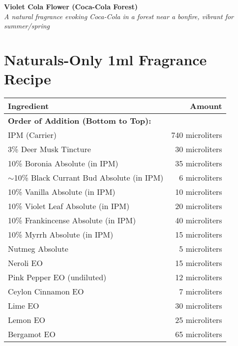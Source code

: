 \documentclass{article}
\begin{document}
\begin{center}
\textcolor{violetPurple}{\LARGE\textbf{Violet Cola Flower (Coca-Cola Forest)}}\\[0.5cm]
\textcolor{colaBrown}{\large\textit{A natural fragrance evoking Coca-Cola in a forest near a bonfire, vibrant for summer/spring}}\\[0.5cm]
\end{center}

\section*{Naturals-Only 1ml Fragrance Recipe}

\begin{center}
\begin{tabular}{p{6.5cm}r}
\toprule
\textcolor{colaRed}{\textbf{Ingredient}} & \textcolor{colaRed}{\textbf{Amount}} \\
\midrule
\multicolumn{2}{l}{\textcolor{violetPurple}{\textbf{Order of Addition (Bottom to Top):}}} \\
\midrule
IPM (Carrier) & 740 microliters \\
3\% Deer Musk Tincture & 30 microliters \\
10\% Boronia Absolute (in IPM) & 35 microliters \\
$\sim$10\% Black Currant Bud Absolute (in IPM) & 6 microliters \\
10\% Vanilla Absolute (in IPM) & 10 microliters \\
10\% Violet Leaf Absolute (in IPM) & 20 microliters \\
10\% Frankincense Absolute (in IPM) & 40 microliters \\
10\% Myrrh Absolute (in IPM) & 15 microliters \\
Nutmeg Absolute & 5 microliters \\
Neroli EO & 15 microliters \\
Pink Pepper EO (undiluted) & 12 microliters \\
Ceylon Cinnamon EO & 7 microliters \\
Lime EO & 30 microliters \\
Lemon EO & 25 microliters \\
Bergamot EO & 65 microliters \\
\bottomrule
\end{tabular}
\end{center}

\vspace{0.5cm}
\end{document}
